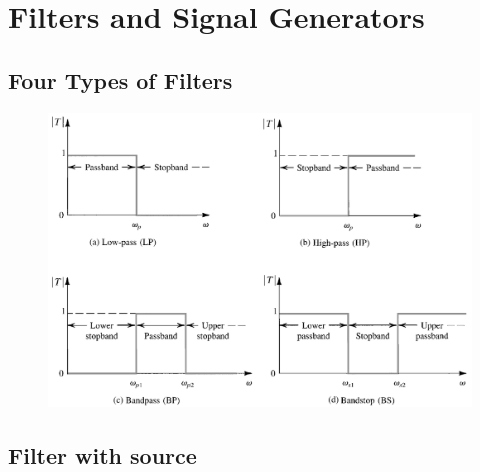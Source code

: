 \chapter{Filters and Signal Generators}

\section{Four Types of Filters}

\begin{figure}[H]
  \centering
  \includegraphics[width=0.75\linewidth]{figures/Filter-types}
\end{figure}

\section{Filter with source}

